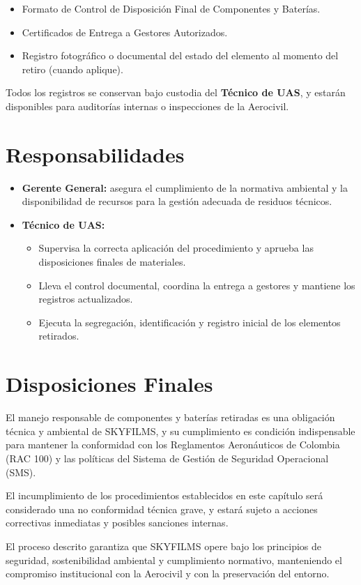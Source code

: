 \begin{itemize}
    \item Formato de Control de Disposición Final de Componentes y Baterías.

    \item Certificados de Entrega a Gestores Autorizados.

    \item Registro fotográfico o documental del estado del elemento al momento del retiro (cuando aplique).
\end{itemize}

Todos los registros se conservan bajo custodia del \textbf{Técnico de UAS}, y estarán disponibles para auditorías internas o inspecciones de la Aerocivil.

\section{Responsabilidades}
\begin{itemize}
    \item \textbf{Gerente General:} asegura el cumplimiento de la normativa ambiental y la disponibilidad de recursos para la gestión adecuada de residuos técnicos.

    \item \textbf{Técnico de UAS:} 
    
        \begin{itemize}
            \item Supervisa la correcta aplicación del procedimiento y aprueba las disposiciones finales de materiales.

            \item Lleva el control documental, coordina la entrega a gestores y mantiene los registros actualizados.
            
            \item Ejecuta la segregación, identificación y registro inicial de los elementos retirados.
        \end{itemize}
 
\end{itemize}

\section{Disposiciones Finales}
El manejo responsable de componentes y baterías retiradas es una obligación técnica y ambiental de SKYFILMS, y su cumplimiento es condición indispensable para mantener la conformidad con los Reglamentos Aeronáuticos de Colombia (RAC 100) y las políticas del Sistema de Gestión de Seguridad Operacional (SMS).

El incumplimiento de los procedimientos establecidos en este capítulo será considerado una no conformidad técnica grave, y estará sujeto a acciones correctivas inmediatas y posibles sanciones internas.

El proceso descrito garantiza que SKYFILMS opere bajo los principios de seguridad, sostenibilidad ambiental y cumplimiento normativo, manteniendo el compromiso institucional con la Aerocivil y con la preservación del entorno.